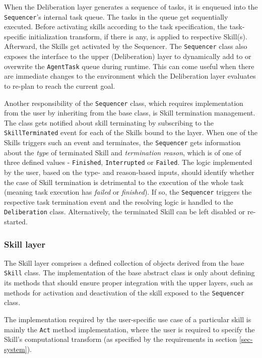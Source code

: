 \documentclass[0main.tex]{subfiles}
\begin{document}
When the Deliberation layer generates a sequence of tasks, it is enqueued into the
\texttt{Sequencer}'s internal task queue. The tasks in the queue get sequentially executed. 
Before activating skills according to the task specification, the task-specific 
initialization transform, if there is any, is applied to respective Skill(s). Afterward, 
the Skills get activated by the Sequencer. The \texttt{Sequencer} class also exposes the interface 
to the upper (Deliberation) layer to dynamically add to or overwrite the \texttt{AgentTask} queue 
during runtime. This can come useful when there are immediate changes to the environment which 
the Deliberation layer evaluates to re-plan to reach the current goal. 

Another responsibility of the \texttt{Sequencer} class, which requires implementation from the 
user by inheriting from the base class, is Skill termination management. The class gets notified about skill terminating
by subscribing to the \texttt{SkillTerminated} event for each of the Skills bound to the layer.
When one of the Skills triggers such an event and terminates, the \texttt{Sequencer} gets information 
about the \emph{type} of terminated Skill and \emph{termination reason}, which is of one of 
three defined values - \texttt{Finished}, \texttt{Interrupted} or \texttt{Failed}. The logic 
implemented by the user, based on the type- and reason-based inputs, should identify whether 
the case of Skill termination is detrimental to the execution of the whole task (meaning 
task execution has \emph{failed} or \emph{finished}). If so, the \texttt{Sequencer} triggers
the respective task termination event and the resolving logic is handled to the \texttt{Deliberation}
class. Alternatively, the terminated Skill can be left disabled or re-started. 

\subsubsection{Skill layer}

The Skill layer comprises a defined collection of objects derived from the base
\texttt{Skill} class. The implementation of the base abstract class is only about 
defining its methods that should ensure proper integration with the upper layers, such 
as methods for activation and deactivation of the skill exposed to the \texttt{Sequencer}
class.

The implementation required by the user-specific use case of a particular skill is mainly 
the \texttt{Act} method implementation, where the user is required to specify the Skill's
computational transform (as specified by the requirements in section \ref{sec-system}).
\end{document}

